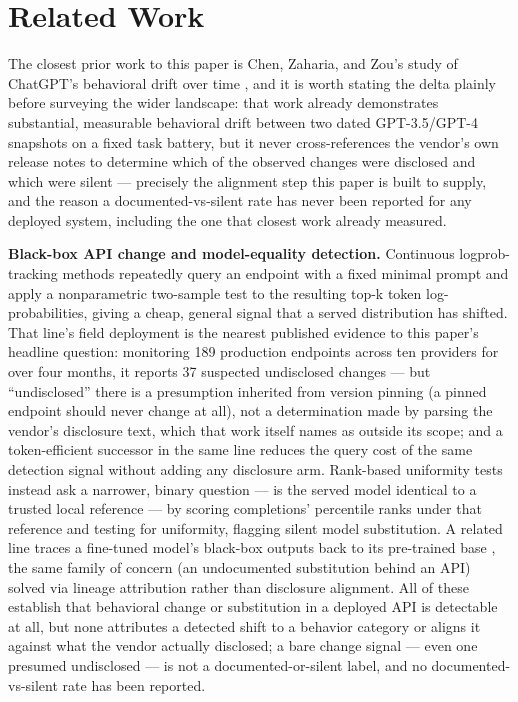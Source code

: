 \documentclass[11pt]{article}
\begin{document}
\section{Related Work}

The closest prior work to this paper is Chen, Zaharia, and Zou's study of ChatGPT's behavioral drift over time \citep{Chen2023ChatGPTBehavior}, and it is worth stating the delta plainly before surveying the wider landscape: that work already demonstrates substantial, measurable behavioral drift between two dated GPT-3.5/GPT-4 snapshots on a fixed task battery, but it never cross-references the vendor's own release notes to determine which of the observed changes were disclosed and which were silent --- precisely the alignment step this paper is built to supply, and the reason a documented-vs-silent rate has never been reported for any deployed system, including the one that closest work already measured.

\textbf{Black-box API change and model-equality detection.} Continuous logprob-tracking methods \citep{LogProbTracking} repeatedly query an endpoint with a fixed minimal prompt and apply a nonparametric two-sample test to the resulting top-k token log-probabilities, giving a cheap, general signal that a served distribution has shifted. That line's field deployment is the nearest published evidence to this paper's headline question: monitoring 189 production endpoints across ten providers for over four months, it reports 37 suspected undisclosed changes --- but ``undisclosed'' there is a presumption inherited from version pinning (a pinned endpoint should never change at all), not a determination made by parsing the vendor's disclosure text, which that work itself names as outside its scope; and a token-efficient successor in the same line \citep[arXiv:2602.11083]{Chauvin2026TokenEfficient} reduces the query cost of the same detection signal without adding any disclosure arm. Rank-based uniformity tests \citep{RankUniformity} instead ask a narrower, binary question --- is the served model identical to a trusted local reference --- by scoring completions' percentile ranks under that reference and testing for uniformity, flagging silent model substitution. A related line traces a fine-tuned model's black-box outputs back to its pre-trained base \citep{Foley2023Matching}, the same family of concern (an undocumented substitution behind an API) solved via lineage attribution rather than disclosure alignment. All of these establish that behavioral change or substitution in a deployed API is detectable at all, but none attributes a detected shift to a behavior category or aligns it against what the vendor actually disclosed; a bare change signal --- even one presumed undisclosed --- is not a documented-or-silent label, and no documented-vs-silent rate has been reported.
\end{document}
